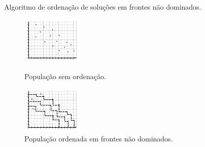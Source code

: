 \begin{algorithm}
  
  \caption{Algoritmo de ordenação de soluções em frontes não dominados.}
  \label{alg:frontsort}
\end{algorithm}

\begin{figure}
  \centering
  \begin{minipage}[t]{0.48\textwidth}
    \includegraphics[width=\textwidth]{img/sce/unrankpop}
    \caption{População sem ordenação.}
    \label{img:unrankpop}
  \end{minipage}
  \hfill
  \begin{minipage}[t]{0.48\textwidth}
    \includegraphics[width=\textwidth]{img/sce/rankpop}
    \caption{População ordenada em frontes não dominados.}
    \label{img:rankpop}
  \end{minipage}
\end{figure}

